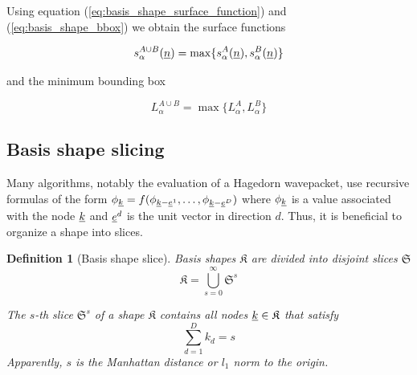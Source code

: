 \documentclass{article}
\newtheorem{definition}{Definition}
\begin{document}
Using equation (\ref{eq:basis_shape_surface_function}) and (\ref{eq:basis_shape_bbox})
we obtain the surface functions

\begin{equation}
  s_{\alpha}^{A \cup B}(\underline{n}) = \max\{s_{\alpha}^A(\underline{n}), s_{\alpha}^B(\underline{n})\}
\end{equation}

and the minimum bounding box

\begin{equation}
  L_{\alpha}^{A \cup B} = \max\{L_{\alpha}^{A}, L_{\alpha}^{B}\}
\end{equation}

\subsection{Basis shape slicing} \label{sec:basis_shape_slice}
Many algorithms, notably the evaluation of a Hagedorn wavepacket,
use recursive formulas of the form
\( \phi_{\underline{k}} = f(\phi_{\underline{k}-\underline{e}^1}, \ldots,
\phi_{\underline{k}-\underline{e}^D}) \)
where \( \phi_{\underline{k}} \)
is a value associated with the node \( \underline{k} \) and
\( \underline{e}^d \) is the unit vector in direction \( d \).
Thus, it is beneficial to organize a shape into slices.

\begin{definition}[Basis shape slice]
  \label{eq:basis_shape_slice}
  Basis shapes \(\mathfrak{K}\) are divided into disjoint slices \(\mathfrak{S}\)
  \begin{equation}
    \mathfrak{K}=\bigcup_{s=0}^{\infty} \mathfrak{S}^s
  \end{equation}

  The \( s \)-th
  slice \( \mathfrak{S}^s \) of a shape \( \mathfrak{K} \)
  contains all nodes \( \underline{k} \in \mathfrak{K} \)
  that satisfy
  \begin{equation}
    \sum_{d=1}^{D} k_d = s
  \end{equation}
  Apparently, \(s\) is the Manhattan distance or $l_1$ norm to the origin.
\end{definition}
\end{document}
